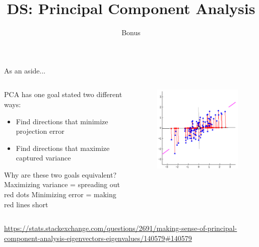 \documentclass[aspectratio=169]{../latex_main/tntbeamer}  %
\title[Introduction]{DS: Principal Component Analysis}
\subtitle{Bonus}
\begin{document}
	
	\maketitle
	\begin{frame}{As an aside...}
	    \begin{columns}
	        \begin{column}{.4\textwidth}
	                PCA has one goal stated two different ways:
	                \begin{itemize}
	                    \item Find directions that minimize projection error
	                    \item Find directions that maximize captured variance
	                \end{itemize}
	                \bigskip
	                Why are these two goals equivalent?
                    Maximizing variance = spreading out red dots
                    Minimizing error = making red lines short
	        \end{column}
	        
	        
	        \begin{column}{.6\textwidth}
	                \begin{figure}
	                    \includegraphics[scale=.25]{Bild18}
	                \end{figure}
	        \end{column}
	    \end{columns}
	    \url{https://stats.stackexchange.com/questions/2691/making-sense-of-principal-component-analysis-eigenvectors-eigenvalues/140579\#140579}

	\end{frame}
	
\end{document}
